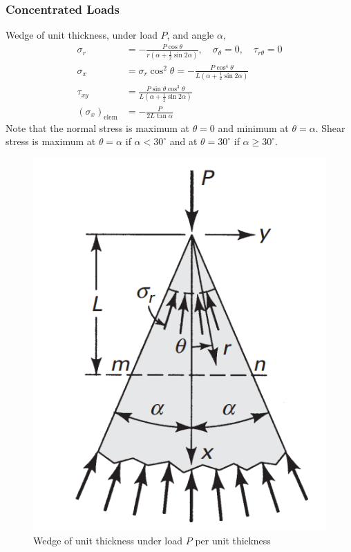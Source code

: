 \subsubsection*{Concentrated Loads}
Wedge of unit thickness, under load $P$, and angle $\alpha$,
\begin{align*}
    \sigma_{r} &= - \frac{P \cos{\theta}}{r(\alpha + \frac{1}{2}\sin{2\alpha})},\quad \sigma_{\theta} = 0, \quad \tau_{r\theta} = 0\\
    \sigma_{x} &= \sigma_{r} \cos^2{\theta} = - \frac{P \cos^4{\theta}}{L(\alpha + \frac{1}{2}\sin{2\alpha})} \\
    \tau_{xy} &= \frac{P\sin\theta \cos^3\theta}{L(\alpha + \frac{1}{2}\sin{2\alpha})} \\
    (\sigma_{x})_{\text{elem}} &= - \frac{P}{2L\tan{\alpha}}
\end{align*}
Note that the normal stress is maximum at $\theta = 0$ and minimum at $\theta = \alpha$. Shear stress is maximum at 
$\theta = \alpha$ if $\alpha < 30^\circ$ and at $\theta = 30^\circ$ if $\alpha \geq 30^\circ$.
\begin{figure}[H]
    \centering
    \includegraphics[width=0.3\linewidth]{Figures/sec3 concentrated load P.png}
    \caption{Wedge of unit thickness under load $P$ per unit thickness}
    \label{fig:sec3 concentrated load P}
\end{figure}
